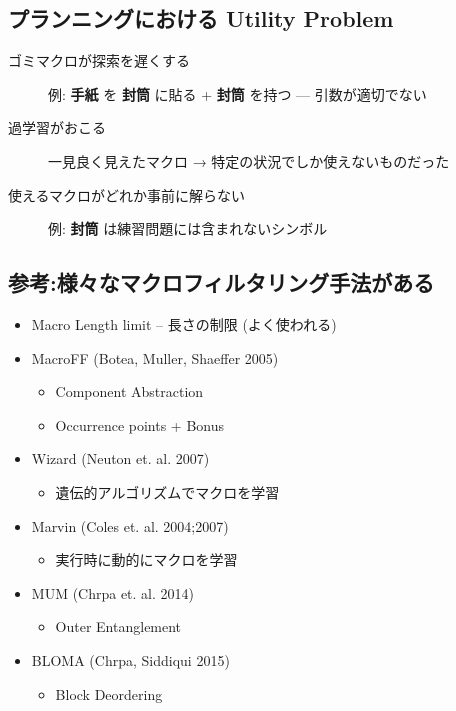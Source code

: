 \subsection{プランニングにおける Utility Problem}
\label{sec-6-7}

\begin{description}
\item[{ゴミマクロが探索を遅くする}] 例: \textbf{手紙} を \textbf{封筒} に貼る + \textbf{封筒} を持つ --- 引数が適切でない

\item[{過学習がおこる}] 一見良く見えたマクロ → 特定の状況でしか使えないものだった

\item[{使えるマクロがどれか事前に解らない}] 例: \textbf{封筒} は練習問題には含まれないシンボル
\end{description}

\subsection{参考:様々なマクロフィルタリング手法がある}
\label{sec-6-8}

\begin{smaller}
\begin{itemize}
\item Macro Length limit -- 長さの制限 (よく使われる)
\item MacroFF (Botea, Muller, Shaeffer 2005)
\begin{itemize}
\item Component Abstraction
\item Occurrence points + Bonus
\end{itemize}
\item Wizard (Neuton et. al. 2007)
\begin{itemize}
\item 遺伝的アルゴリズムでマクロを学習
\end{itemize}
\item Marvin (Coles et. al. 2004;2007)
\begin{itemize}
\item 実行時に動的にマクロを学習
\end{itemize}
\item MUM (Chrpa et. al. 2014)
\begin{itemize}
\item Outer Entanglement
\end{itemize}
\item BLOMA (Chrpa, Siddiqui 2015)
\begin{itemize}
\item Block Deordering
\end{itemize}
\end{itemize}
\end{smaller}

